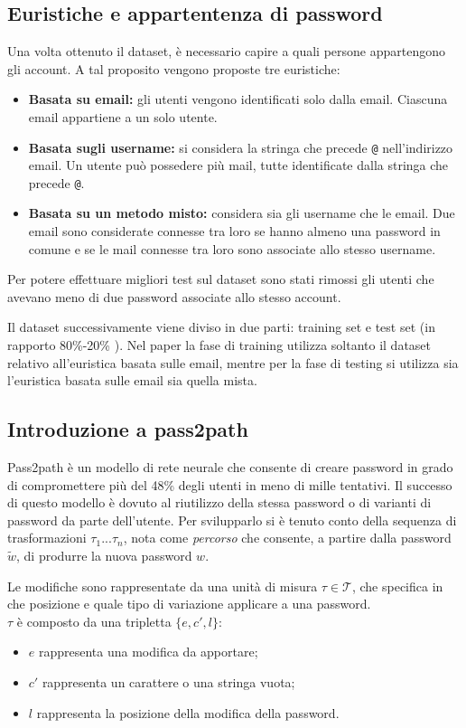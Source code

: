 \subsection{Euristiche e appartentenza di password}
\label{sec:euristiche e appartenenza di password}
Una volta ottenuto il dataset, è necessario capire a quali persone appartengono gli account. A tal proposito vengono proposte tre euristiche:
\begin{itemize}
    \item \textbf{Basata su email:} gli utenti vengono identificati solo dalla email. Ciascuna email appartiene a un solo utente.
    \item \textbf{Basata sugli username:} si considera la stringa che precede \texttt{@} nell'indirizzo email. Un utente può possedere più mail, tutte identificate dalla stringa che precede \texttt{@}.
    \item \textbf{Basata su un metodo misto:} considera sia gli username che le email. Due email sono considerate connesse tra loro se hanno almeno una password in comune e se le mail connesse tra loro sono associate allo stesso username.
\end{itemize}
Per potere effettuare migliori test sul dataset sono stati rimossi gli utenti che avevano meno di due password associate allo stesso account.

Il dataset successivamente viene diviso in due parti: training set e test set (in rapporto 80\%-20\% ). Nel paper la fase di training utilizza soltanto il dataset relativo all'euristica basata sulle email, mentre per la fase di testing si utilizza sia l'euristica basata sulle email sia quella mista.

\subsection{Introduzione a pass2path}
\label{sec:intro pass2path}
Pass2path è un modello di rete neurale che consente di creare password in grado di compromettere più del 48\% degli utenti in meno di mille tentativi. Il successo di questo modello è dovuto al riutilizzo della stessa password o di varianti di password da parte dell'utente.
Per svilupparlo si è tenuto conto della sequenza di trasformazioni $\tau_1...\tau_n $, nota come \emph{percorso} che consente, a partire dalla password  $\tilde{w}$, di produrre la nuova password $w$.


Le modifiche sono rappresentate da una unità di misura $\tau\in \mathcal{T}$, che specifica in che posizione e quale tipo di variazione applicare a una password.
\\
$\tau$ è composto da una tripletta  $\{e, c', l\}$:
\begin{itemize}
    \item $e$ rappresenta una modifica da apportare;
    \item $c'$ rappresenta un carattere o una stringa vuota;
    \item $l$ rappresenta la posizione della modifica della password.
\end{itemize}


